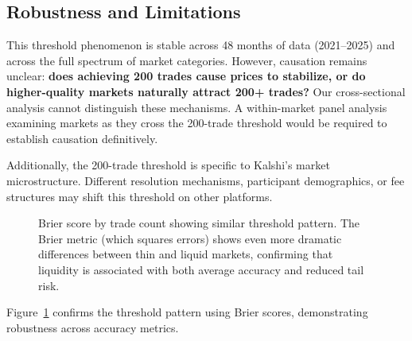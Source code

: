 \documentclass[12pt,letterpaper]{article}
\begin{document}
\subsection{Robustness and Limitations}

This threshold phenomenon is stable across 48 months of data (2021--2025) and across the full spectrum of market categories. However, causation remains unclear: \textbf{does achieving 200 trades cause prices to stabilize, or do higher-quality markets naturally attract 200+ trades?} Our cross-sectional analysis cannot distinguish these mechanisms. A within-market panel analysis examining markets as they cross the 200-trade threshold would be required to establish causation definitively.

Additionally, the 200-trade threshold is specific to Kalshi's market microstructure. Different resolution mechanisms, participant demographics, or fee structures may shift this threshold on other platforms.

\begin{figure}[ht]
\centering
{}
\caption{Brier score by trade count showing similar threshold pattern. The Brier metric (which squares errors) shows even more dramatic differences between thin and liquid markets, confirming that liquidity is associated with both average accuracy and reduced tail risk.}
\label{fig:brier-threshold}
\end{figure}

Figure~\ref{fig:brier-threshold} confirms the threshold pattern using Brier scores, demonstrating robustness across accuracy metrics.
\end{document}
